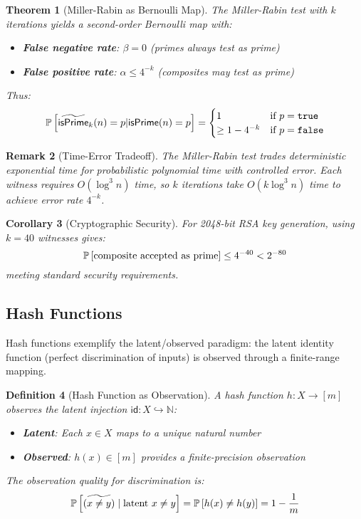 \documentclass[11pt,final,hidelinks]{article}
\newtheorem{theorem}{Theorem}[section]
\newtheorem{corollary}[theorem]{Corollary}
\newtheorem{definition}[theorem]{Definition}
\newtheorem{remark}[theorem]{Remark}
\begin{document}
\begin{theorem}[Miller-Rabin as Bernoulli Map]
The Miller-Rabin test with $k$ iterations yields a second-order Bernoulli map with:
\begin{itemize}
    \item \textbf{False negative rate}: $\beta = 0$ (primes always test as prime)
    \item \textbf{False positive rate}: $\alpha \leq 4^{-k}$ (composites may test as prime)
\end{itemize}
Thus:
\begin{equation}
\mathbb{P}\left[\widetilde{\mathsf{isPrime}}_k(n) = p | \mathsf{isPrime}(n) = p\right] = \begin{cases}
1 & \text{if } p = \mathtt{true} \\
\geq 1 - 4^{-k} & \text{if } p = \mathtt{false}
\end{cases}
\end{equation}
\end{theorem}

\begin{remark}[Time-Error Tradeoff]
The Miller-Rabin test trades deterministic exponential time for probabilistic polynomial time with controlled error. Each witness requires $O(\log^3 n)$ time, so $k$ iterations take $O(k \log^3 n)$ time to achieve error rate $4^{-k}$.
\end{remark}

\begin{corollary}[Cryptographic Security]
For 2048-bit RSA key generation, using $k = 40$ witnesses gives:
\begin{equation}
\mathbb{P}\left[\text{composite accepted as prime}\right] \leq 4^{-40} < 2^{-80}
\end{equation}
meeting standard security requirements.
\end{corollary}

\subsection{Hash Functions}

Hash functions exemplify the latent/observed paradigm: the latent identity function (perfect discrimination of inputs) is observed through a finite-range mapping.

\begin{definition}[Hash Function as Observation]
A hash function $h : X \to [m]$ observes the latent injection $\mathsf{id} : X \hookrightarrow \mathbb{N}$:
\begin{itemize}
    \item \textbf{Latent}: Each $x \in X$ maps to a unique natural number
    \item \textbf{Observed}: $h(x) \in [m]$ provides a finite-precision observation
\end{itemize}
The observation quality for discrimination is:
\begin{equation}
\mathbb{P}\left[\widetilde{(x \neq y)} \mid \text{latent } x \neq y\right] = \mathbb{P}\left[h(x) \neq h(y)\right] = 1 - \frac{1}{m}
\end{equation}
\end{definition}
\end{document}
